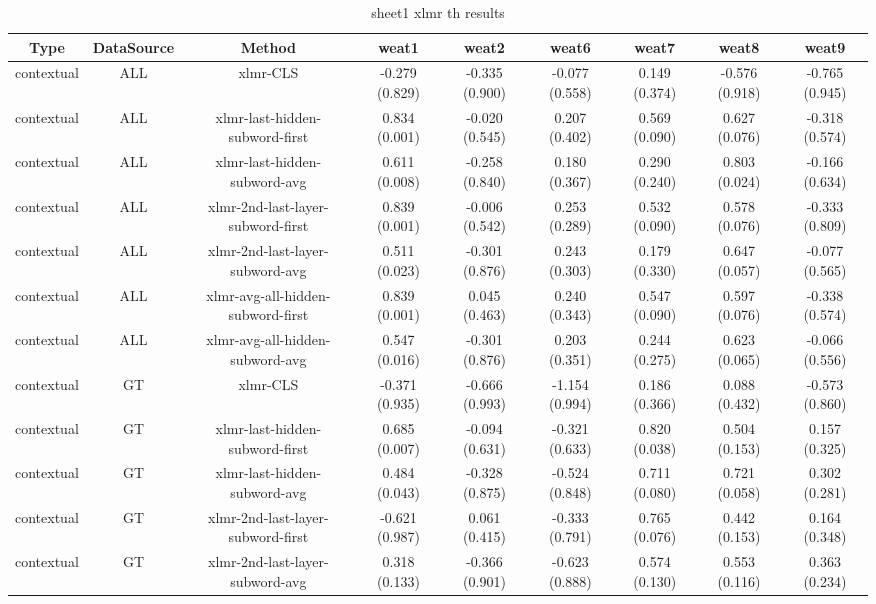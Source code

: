 \begin{sidewaystable}[htb]
    \centering
    \caption{sheet1 xlmr th results}
    \label{appendix_tab:sheet1_xlmr_th_results}
    \small
    \begin{tabular}{@{}ccccccccc@{}}
        \toprule
        Type & DataSource & Method & weat1 & weat2 & weat6 & weat7 & weat8 & weat9 \\
        \midrule
        contextual & ALL & xlmr-CLS & -0.279 (0.829) & -0.335 (0.900) & -0.077 (0.558) & 0.149 (0.374) & -0.576 (0.918) & -0.765 (0.945) \\
        contextual & ALL & xlmr-last-hidden-subword-first & 0.834 (0.001) & -0.020 (0.545) & 0.207 (0.402) & 0.569 (0.090) & 0.627 (0.076) & -0.318 (0.574) \\
        contextual & ALL & xlmr-last-hidden-subword-avg & 0.611 (0.008) & -0.258 (0.840) & 0.180 (0.367) & 0.290 (0.240) & 0.803 (0.024) & -0.166 (0.634) \\
        contextual & ALL & xlmr-2nd-last-layer-subword-first & 0.839 (0.001) & -0.006 (0.542) & 0.253 (0.289) & 0.532 (0.090) & 0.578 (0.076) & -0.333 (0.809) \\
        contextual & ALL & xlmr-2nd-last-layer-subword-avg & 0.511 (0.023) & -0.301 (0.876) & 0.243 (0.303) & 0.179 (0.330) & 0.647 (0.057) & -0.077 (0.565) \\
        contextual & ALL & xlmr-avg-all-hidden-subword-first & 0.839 (0.001) & 0.045 (0.463) & 0.240 (0.343) & 0.547 (0.090) & 0.597 (0.076) & -0.338 (0.574) \\
        contextual & ALL & xlmr-avg-all-hidden-subword-avg & 0.547 (0.016) & -0.301 (0.876) & 0.203 (0.351) & 0.244 (0.275) & 0.623 (0.065) & -0.066 (0.556) \\
        contextual & GT & xlmr-CLS & -0.371 (0.935) & -0.666 (0.993) & -1.154 (0.994) & 0.186 (0.366) & 0.088 (0.432) & -0.573 (0.860) \\
        contextual & GT & xlmr-last-hidden-subword-first & 0.685 (0.007) & -0.094 (0.631) & -0.321 (0.633) & 0.820 (0.038) & 0.504 (0.153) & 0.157 (0.325) \\
        contextual & GT & xlmr-last-hidden-subword-avg & 0.484 (0.043) & -0.328 (0.875) & -0.524 (0.848) & 0.711 (0.080) & 0.721 (0.058) & 0.302 (0.281) \\
        contextual & GT & xlmr-2nd-last-layer-subword-first & -0.621 (0.987) & 0.061 (0.415) & -0.333 (0.791) & 0.765 (0.076) & 0.442 (0.153) & 0.164 (0.348) \\
        contextual & GT & xlmr-2nd-last-layer-subword-avg & 0.318 (0.133) & -0.366 (0.901) & -0.623 (0.888) & 0.574 (0.130) & 0.553 (0.116) & 0.363 (0.234) \\

\end{tabular}
\end{sidewaystable}
